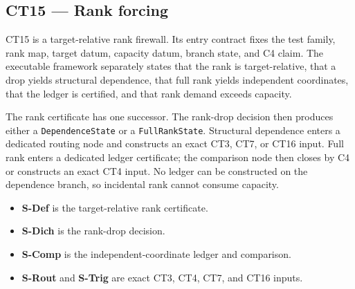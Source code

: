 \subsection{CT15 --- Rank forcing}\label{ct:15}\label{rank-forcing-charge-only-independent-coordinates}

CT15 is a target-relative rank firewall.  Its entry contract fixes the test
family, rank map, target datum, capacity datum, branch state, and C4 claim.
The executable framework separately states that the rank is target-relative,
that a drop yields structural dependence, that full rank yields independent
coordinates, that the ledger is certified, and that rank demand exceeds
capacity.

The rank certificate has one successor.  The rank-drop decision then produces
either a \texttt{DependenceState} or a \texttt{FullRankState}.  Structural
dependence enters a dedicated routing node and constructs an exact CT3, CT7,
or CT16 input.  Full rank enters a dedicated ledger certificate; the comparison
node then closes by C4 or constructs an exact CT4 input.  No ledger can be
constructed on the dependence branch, so incidental rank cannot consume
capacity.

\begin{itemize}
\tightlist
\item \textbf{S-Def} is the target-relative rank certificate.
\item \textbf{S-Dich} is the rank-drop decision.
\item \textbf{S-Comp} is the independent-coordinate ledger and comparison.
\item \textbf{S-Rout} and \textbf{S-Trig} are exact CT3, CT4, CT7, and CT16 inputs.
\end{itemize}

